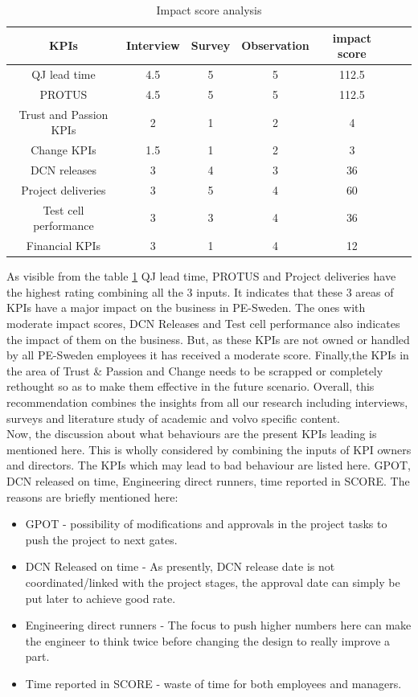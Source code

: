 \begin{enumerate}
\begin{table}[h]
    \centering
    \captionsetup{justification=centering, margin=2cm}
    \begin{tabular}{|c|c|c|c|c|c|c|}
    \hline
    \textbf{KPIs} & \textbf{Interview} & \textbf{Survey} & \textbf{Observation} & \textbf{impact score}\\
    \hline
     QJ lead time & 4.5 & 5 & 5 & 112.5\\\hline
     PROTUS & 4.5 & 5 & 5 & 112.5\\\hline
     Trust and Passion KPIs & 2 & 1 & 2 & 4\\\hline
     Change KPIs & 1.5 & 1 & 2 & 3 \\\hline
     DCN releases & 3 & 4 & 3 & 36\\\hline
     Project deliveries & 3 & 5 & 4 & 60\\\hline
     Test cell performance & 3 & 3 & 4 & 36\\\hline
     Financial KPIs & 3 & 1 & 4 & 12\\\hline
    \end{tabular}
    \caption{Impact score analysis}
   \label{tab:impact}
\end{table}

As visible from the table \ref{tab:impact} QJ lead time, PROTUS and Project deliveries have the highest rating combining all the 3 inputs. It indicates that these 3 areas of KPIs have a major impact on the business in PE-Sweden. The ones with moderate impact scores, DCN Releases and Test cell performance also indicates the impact of them on the business. But, as these KPIs are not owned or handled by all PE-Sweden employees it has received a moderate score. Finally,the KPIs in the area of Trust & Passion and Change needs to be scrapped or completely rethought so as to make them effective in the future scenario.
Overall, this recommendation combines the insights from all our research including interviews, surveys and literature study of academic and volvo specific content.\\

Now, the discussion about what behaviours are the present KPIs leading is mentioned here. This is wholly considered by combining the inputs of KPI owners and directors. The KPIs which may lead to bad behaviour are listed here. GPOT, DCN released on time, Engineering direct runners, time reported in SCORE. The reasons are briefly mentioned here:
\begin{itemize}
    \item GPOT - possibility of modifications and approvals in the project tasks to push the project to next gates.
    \item DCN Released on time - As presently, DCN release date is not coordinated/linked with the project stages, the approval date can simply be put later to achieve good rate.
    \item Engineering direct runners - The focus to push higher numbers here can make the engineer to think twice before changing the design to really improve a part.
    \item Time reported in SCORE - waste of time for both employees and managers.
\end{itemize}


\end{enumerate}
